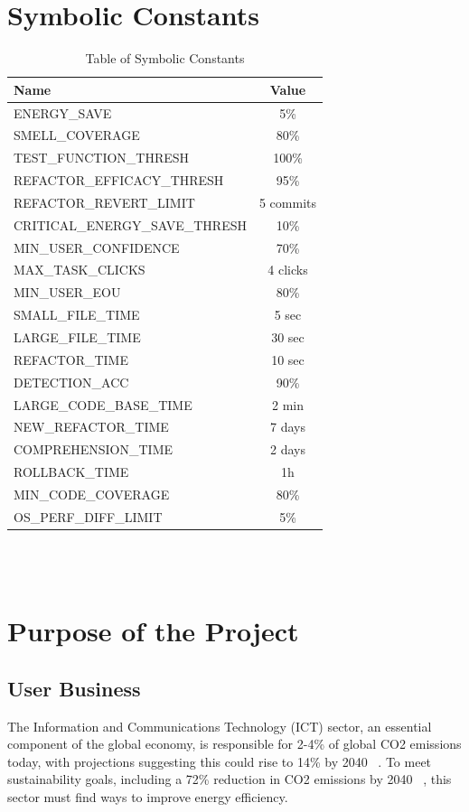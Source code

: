 \documentclass[12pt]{article}
\begin{document}
\section*{Symbolic Constants}
\begin{table}[H]
  \centering
  \begin{tabular}{|l|c|}
    \toprule \textbf{Name} & \textbf{Value} \\
    \midrule
    ENERGY\_SAVE & 5\% \\
    SMELL\_COVERAGE & 80\% \\
    TEST\_FUNCTION\_THRESH & 100\% \\
    REFACTOR\_EFFICACY\_THRESH & 95\% \\
    REFACTOR\_REVERT\_LIMIT & 5 commits \\
    CRITICAL\_ENERGY\_SAVE\_THRESH & 10\% \\
    MIN\_USER\_CONFIDENCE & 70\% \\
    MAX\_TASK\_CLICKS & 4 clicks \\
    MIN\_USER\_EOU & 80\% \\
    SMALL\_FILE\_TIME & 5 sec \\
    LARGE\_FILE\_TIME & 30 sec \\
    REFACTOR\_TIME & 10 sec \\
    DETECTION\_ACC & 90\% \\
    LARGE\_CODE\_BASE\_TIME & 2 min \\
    NEW\_REFACTOR\_TIME & 7 days \\
    COMPREHENSION\_TIME & 2 days \\
    ROLLBACK\_TIME & 1h \\
    MIN\_CODE\_COVERAGE & 80\% \\
    OS\_PERF\_DIFF\_LIMIT & 5\% \\
    \bottomrule
  \end{tabular}
  \caption{Table of Symbolic Constants}
  \label{tab:syms}
\end{table}

~\\

~\newpage


\section{Purpose of the Project}
\subsection{User Business}
The Information and Communications Technology (ICT) sector, an
essential component of the global economy, is responsible for 2-4\%
of global CO2 emissions today, with projections suggesting this could
rise to 14\% by 2040 ~\citep{BelkhirAndElmeligi2018}. To meet
sustainability goals, including a 72\% reduction in CO2 emissions by
2040 ~\citep{FreitagAndBernersLee2021}, this sector must find ways to
improve energy efficiency.
\end{document}
